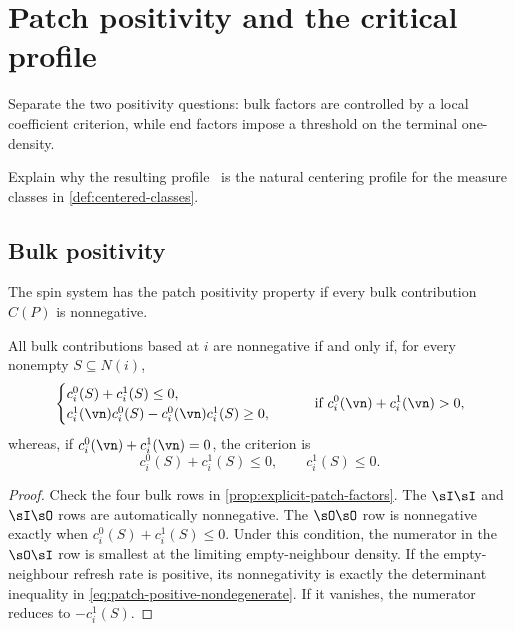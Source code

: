\section{Patch positivity and the critical profile}
\label{sec:patch-positivity}

\begin{discussion}
  \item Separate the two positivity questions: bulk factors are
  controlled by a local coefficient criterion, while end factors
  impose a threshold on the terminal one-density.
  \item Explain why the resulting profile \pstar\ is the natural
  centering profile for the measure classes in
  \cref{def:centered-classes}.
\end{discussion}

\subsection{Bulk positivity}

\begin{definition}
\label{def:patch-positivity}
The spin system has the patch positivity property if every bulk
contribution \(C(P)\) is nonnegative.
\end{definition}

\begin{theorem}
\label{thm:patch-positivity-criterion}
All bulk contributions based at \(i\) are nonnegative if and only if,
for every nonempty \(S\subseteq N(i)\),
\begin{equation}
  \begin{cases}
  c_i^0(S)+c_i^1(S)\le0,\\
  c_i^1(\vn)c_i^0(S)-c_i^0(\vn)c_i^1(S)\ge0,
  \end{cases}
  \qquad
  \text{if }c_i^0(\vn)+c_i^1(\vn)>0,
  \label{eq:patch-positive-nondegenerate}
\end{equation}
whereas, if \(c_i^0(\vn)+c_i^1(\vn)=0\), the criterion is
\begin{equation}
  c_i^0(S)+c_i^1(S)\le0,
  \qquad
  c_i^1(S)\le0.
  \label{eq:patch-positive-degenerate}
\end{equation}
\end{theorem}

\begin{proof}
Check the four bulk rows in
\cref{prop:explicit-patch-factors}. The \(\sI\sI\) and
\(\sI\sO\) rows are automatically nonnegative. The \(\sO\sO\) row is
nonnegative exactly when \(c_i^0(S)+c_i^1(S)\le0\). Under this
condition, the numerator in the \(\sO\sI\) row is smallest at the
limiting empty-neighbour density. If the empty-neighbour refresh rate
is positive, its nonnegativity is exactly the determinant inequality
in \eqref{eq:patch-positive-nondegenerate}. If it vanishes, the
numerator reduces to \(-c_i^1(S)\).
\end{proof}

